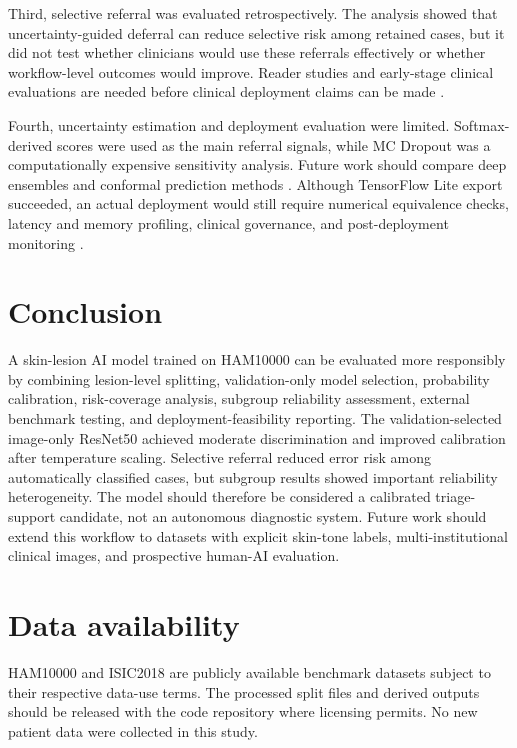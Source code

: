 \documentclass[11pt,a4paper]{article}
\newcommand{\dataset}{HAM10000}
\newcommand{\isic}{ISIC2018}
\begin{document}
Third, selective referral was evaluated retrospectively. The analysis showed that uncertainty-guided deferral can reduce selective risk among retained cases, but it did not test whether clinicians would use these referrals effectively or whether workflow-level outcomes would improve. Reader studies and early-stage clinical evaluations are needed before clinical deployment claims can be made \citep{krakowski2024humanai,vasey2022decideai}.

Fourth, uncertainty estimation and deployment evaluation were limited. Softmax-derived scores were used as the main referral signals, while MC Dropout was a computationally expensive sensitivity analysis. Future work should compare deep ensembles and conformal prediction methods \citep{lakshminarayanan2017ensembles,fayyad2024conformal,lu2022fairconformal}. Although TensorFlow Lite export succeeded, an actual deployment would still require numerical equivalence checks, latency and memory profiling, clinical governance, and post-deployment monitoring \citep{tensorflow2024tflite,thomas2023deployment}.
\section{Conclusion}

A skin-lesion AI model trained on \dataset{} can be evaluated more responsibly by combining lesion-level splitting, validation-only model selection, probability calibration, risk-coverage analysis, subgroup reliability assessment, external benchmark testing, and deployment-feasibility reporting. The validation-selected image-only ResNet50 achieved moderate discrimination and improved calibration after temperature scaling. Selective referral reduced error risk among automatically classified cases, but subgroup results showed important reliability heterogeneity. The model should therefore be considered a calibrated triage-support candidate, not an autonomous diagnostic system. Future work should extend this workflow to datasets with explicit skin-tone labels, multi-institutional clinical images, and prospective human-AI evaluation.

\section*{Data availability}

\dataset{} and \isic{} are publicly available benchmark datasets subject to their respective data-use terms. The processed split files and derived outputs should be released with the code repository where licensing permits. No new patient data were collected in this study.
\end{document}
